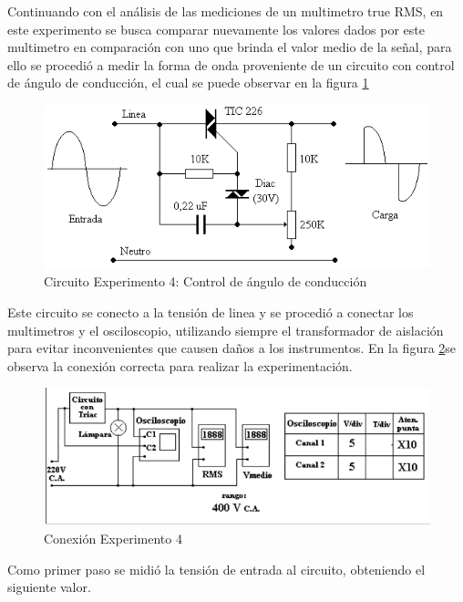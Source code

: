 Continuando con el análisis de las mediciones de un multimetro true RMS, en este experimento se busca comparar nuevamente los valores dados por este multimetro en comparación con uno que brinda el valor medio de la señal, para ello se procedió a medir la forma de onda proveniente de un circuito con control de ángulo de conducción, el cual se puede observar en la figura \ref{fig:circ_triac}




\begin{figure}[H]
    \centering
    \includegraphics[width=0.8\linewidth]{Imagenes/circ_triac.png}
    \caption{Circuito Experimento 4: Control de ángulo de conducción}
    \label{fig:circ_triac}
\end{figure}

Este circuito se conecto a la tensión de linea y se procedió a conectar los multimetros y el osciloscopio, utilizando siempre el transformador de aislación para evitar inconvenientes que causen daños a los instrumentos. En la figura \ref{fig:conec_exp4}se observa la conexión correcta para realizar la experimentación. 
\begin{figure}[H]
    \centering
    \includegraphics[width=0.6\linewidth,trim= 5pt 5pt 8.5cm 0,clip]{Imagenes/conec_exp4.png}
    \caption{Conexión Experimento 4}
    \label{fig:conec_exp4}
\end{figure}

\begin{table}[H]
    \centering
        \caption{Configuración del Osciloscopio}
        \label{tab:cont4}
\end{table}
Como primer paso se midió la tensión de entrada al circuito, obteniendo el siguiente valor.

